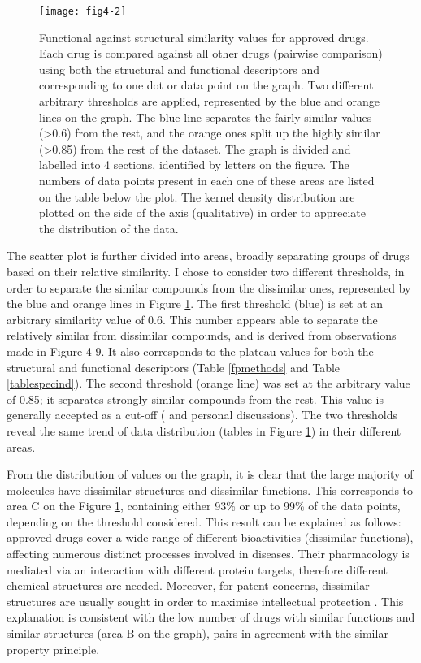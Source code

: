\begin{figure}[H]
    \centering
    \texttt{[image: fig4-2]}
    \caption{Functional against structural similarity values for approved drugs. Each drug is compared against all other drugs (pairwise comparison) using both the structural and functional descriptors and corresponding to one dot or data point on the graph. Two different arbitrary thresholds are applied, represented by the blue and orange lines on the graph. The blue line separates the fairly similar values (\textgreater 0.6) from the rest, and the orange ones split up the highly similar (\textgreater 0.85) from the rest of the dataset. The graph is divided and labelled into 4 sections, identified by letters on the figure. The numbers of data points present in each one of these areas are listed on the table below the plot. The kernel density distribution are plotted on the side of the axis (qualitative) in order to appreciate the distribution of the data.}
    \label{fig4-2}
\end{figure}

The scatter plot is further divided into areas, broadly separating groups of drugs based on their relative similarity. I chose to consider two different thresholds, in order to separate the similar compounds from the dissimilar ones, represented by the blue and orange lines in Figure \ref{fig4-2}. The first threshold (blue) is set at an arbitrary similarity value of 0.6. This number appears able to separate the relatively similar from dissimilar compounds, and is derived from observations made in Figure 4-9. It also corresponds to the plateau values for both the structural and functional descriptors (Table \ref{fpmethods} and Table \ref{tablespecind}). The second threshold (orange line) was set at the arbitrary value of 0.85; it separates strongly similar compounds from the rest. This value is generally accepted as a cut-off (\cite{chemsimwiki} and personal discussions). The two thresholds reveal the same trend of data distribution (tables in Figure \ref{fig4-2}) in their different areas.

From the distribution of values on the graph, it is clear that the large majority of molecules have dissimilar structures and dissimilar functions. This corresponds to area C on the Figure \ref{fig4-2}, containing either 93\% or up to 99\% of the data points, depending on the threshold considered. This result can be explained as follows: approved drugs cover a wide range of different bioactivities (dissimilar functions), affecting numerous distinct processes involved in diseases. Their pharmacology is mediated via an interaction with different protein targets, therefore different chemical structures are needed. Moreover, for patent concerns, dissimilar structures are usually sought in order to maximise intellectual protection \citep{barratt2012drug}. This explanation is consistent with the low number of drugs with similar functions and similar structures (area B on the graph), pairs in agreement with the similar property principle.

